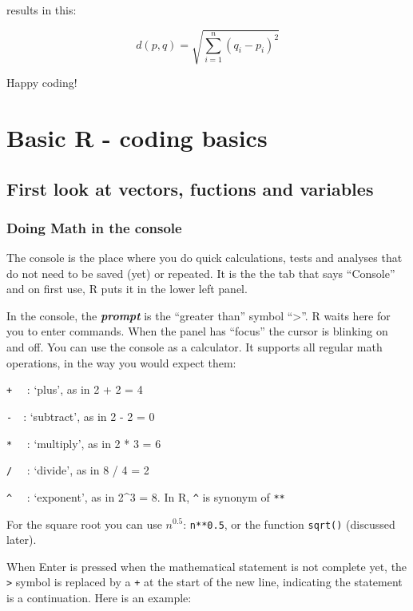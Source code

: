 \documentclass[]{book}
\begin{document}
results in this:

\[d(p, q) = \sqrt{\sum_{i = 1}^{n}(q_i-p_i)^2}\]

Happy coding!

\hypertarget{basic-r---coding-basics}{%
\chapter{Basic R - coding basics}\label{basic-r---coding-basics}}

\hypertarget{first-look-at-vectors-fuctions-and-variables}{%
\section{First look at vectors, fuctions and variables}\label{first-look-at-vectors-fuctions-and-variables}}

\hypertarget{doing-math-in-the-console}{%
\subsection{Doing Math in the console}\label{doing-math-in-the-console}}

The console is the place where you do quick calculations, tests and analyses that do not need to be saved (yet) or repeated. It is the the tab that says ``Console'' and on first use, R puts it in the lower left panel.

In the console, the \textbf{\emph{prompt}} is the ``greater than'' symbol ``\textgreater{}''. R waits here for you to enter commands. When the panel has ``focus'' the cursor is blinking on and off. You can use the console as a calculator. It supports all regular math operations, in the way you would expect them:

\texttt{+}  : `plus', as in 2 + 2 = 4

\texttt{-} : `subtract', as in 2 - 2 = 0

\texttt{*}  : `multiply', as in 2 * 3 = 6

\texttt{/}  : `divide', as in 8 / 4 = 2

\texttt{\^{}}  : `exponent', as in 2\^{}3 = 8. In R, \texttt{\^{}} is synonym of \texttt{**}

For the square root you can use \(n^{0.5}\): \texttt{n**0.5}, or the function \texttt{sqrt()} (discussed later).

When Enter is pressed when the mathematical statement is not complete yet, the \texttt{\textgreater{}} symbol is replaced by a \texttt{+} at the start of the new line, indicating the statement is a continuation. Here is an example:
\end{document}
